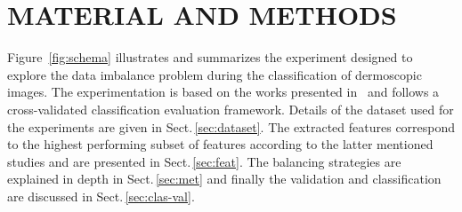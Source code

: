 \graphicspath{ {./content/method/figures/} }

\section{\uppercase{Material and Methods}}\label{sec:mm}


\noindent Figure~\ref{fig:schema} illustrates and summarizes the experiment designed to explore the data imbalance problem during the classification of dermoscopic images.
The experimentation is based on the works presented in~\cite{rastgoo2015automatic, rastgoo2015ensemble} and follows a cross-validated classification evaluation framework.
Details of the dataset used for the experiments are given in Sect.\,\ref{sec:dataset}. 
The extracted features correspond to the highest performing subset of features according to the latter mentioned studies and are presented in Sect.\,\ref{sec:feat}.
The balancing strategies are explained in depth in Sect.\,\ref{sec:met} and finally the validation and classification are discussed in Sect.\,\ref{sec:clas-val}.


